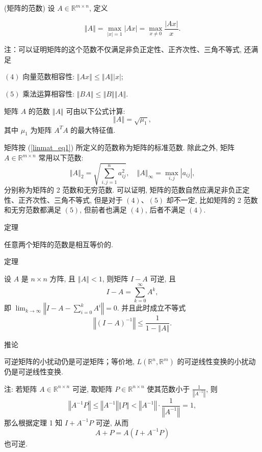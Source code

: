 \begin{definition}{(矩阵的范数)}\label{linmat_def1}
设 $A\in\mathbb{R}^{m\times n}$, 定义

\begin{equation}\label{linmat_eq1}
\left\Vert A\right\Vert =\max_{|x|=1}|Ax|=\max_{x\neq0}{\displaystyle \frac{|Ax|}{x}}.
\end{equation}

\end{definition}
注：可以证明矩阵的这个范数不仅满足非负正定性、正齐次性、三角不等式, 还满足

$(4)$ 向量范数相容性: $\left\Vert Ax\right\Vert \leqslant\left\Vert A\right\Vert \left|x\right|$;

$(5)$ 乘法运算相容性: $\left\Vert BA\right\Vert \leqslant\left\Vert B\right\Vert \left\Vert A\right\Vert $.



\begin{theorem}{}
矩阵 $A$ 的范数 $\left\Vert A\right\Vert $ 可由以下公式计算: 
\[
\left\Vert A\right\Vert =\sqrt{\mu_{1}},
\]
 其中 $\mu_{1}$ 为矩阵 $A^{T}A$ 的最大特征值. 
\end{theorem}

矩阵按 (\autoref{linmat_eq1})  所定义的范数称为矩阵的标准范数. 除此之外, 矩阵 $A\in\mathbb{R}^{m\times n}$ 常用以下范数:
\[
\left\Vert A\right\Vert _{2}=\sqrt{\sum_{i,j=1}^{n}a_{ij}^{2}},\quad\left\Vert A\right\Vert _{\infty}=\max_{i,j}|a_{ij}|,
\]
分别称为矩阵的 2 范数和无穷范数. 可以证明, 矩阵的范数自然应满足非负正定性、正齐次性、三角不等式, 但是对于 $(4)$、$(5)$
却不一定, 比如矩阵的 2 范数和无穷范数都满足 $(5)$, 但前者也满足 $(4)$, 后者不满足 $(4)$. 

定理

任意两个矩阵的范数是相互等价的. 

定理

设 $A$ 是 $n\times n$ 方阵, 且 $\left\Vert A\right\Vert <1$, 则矩阵 $I-A$
可逆, 且 
\[
I-A=\sum_{k=0}^{\infty}A^{k},
\]
即 ${\displaystyle \lim_{k\rightarrow\infty}}\left\Vert I-A-{\displaystyle \sum_{i=0}^{k}A^{i}}\right\Vert =0.$
并且此时成立不等式
\[
\left\Vert (I-A)^{-1}\right\Vert \leqslant{\displaystyle \frac{1}{1-\left\Vert A\right\Vert }.}
\]

推论

可逆矩阵的小扰动仍是可逆矩阵；等价地, $L(\mathbb{R}^{n},\mathbb{R}^{m})$ 的可逆线性变换的小扰动仍是可逆线性变换.

注: 若矩阵 $A\in\mathbb{R}^{n\times n}$ 可逆, 取矩阵 $P\in\mathbb{R}^{n\times n}$
使其范数小于 $\frac{1}{\left\Vert A^{-1}\right\Vert }$, 则
\[
\left\Vert A^{-1}P\right\Vert \leqslant\left\Vert A^{-1}\right\Vert \left\Vert P\right\Vert <\left\Vert A^{-1}\right\Vert \cdot{\displaystyle \frac{1}{\left\Vert A^{-1}\right\Vert }=1,}
\]
那么根据定理 1 知 $I+A^{-1}P$ 可逆, 从而
\[
A+P=A(I+A^{-1}P)
\]
也可逆. 
